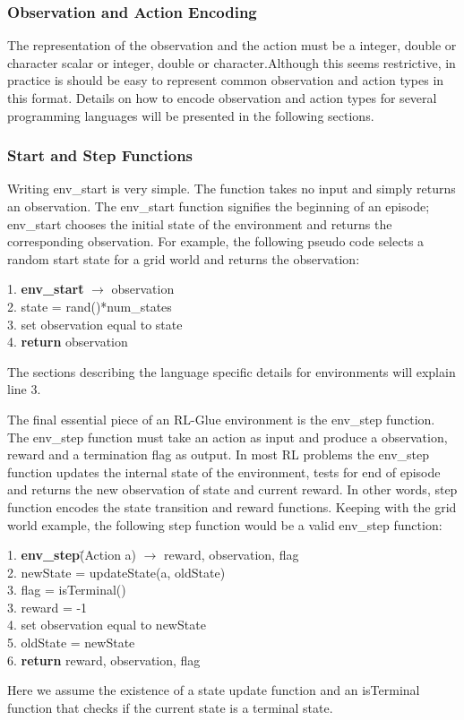 \documentclass[11pt]{article}
\begin{document}
\subsubsection{Observation and Action Encoding}
The representation of the observation and the action must be a integer, double or character scalar or integer, double or character.Although this seems restrictive, in practice is should be easy to represent common observation and action types in this format. Details on how to encode observation and action types for several programming languages will be presented in the following sections.

\subsubsection{Start and Step Functions}
Writing env\_start is very simple. The function takes no input and simply returns an observation. The env\_start function signifies the beginning of an episode; env\_start chooses the initial state of the environment and returns the corresponding observation. For example, the following pseudo code selects a random start state for a grid world and returns the observation:
\begin{tabbing}
1. {\bf env\_start}\= $\rightarrow$ observation\\
2. \>state = rand()*num\_states\\
3. \>set observation equal to state\\
4. {\bf return} observation
\end{tabbing}
The sections describing the language specific details for environments will explain line 3.

The final essential piece of an RL-Glue environment is the env\_step function. The env\_step function must take an action as input and produce a observation, reward and a termination flag as output. In most RL problems the  env\_step function updates the internal state of the environment, tests for end of episode and returns the new observation of state and current reward. In other words, step function encodes the state transition and reward functions. Keeping with the grid world example, the following step function would be a valid env\_step function:
\begin{tabbing}
1. {\bf env\_step}\=(Action a) $\rightarrow$ reward, observation, flag \\
2. \>newState = updateState(a, oldState)\\
3. \> flag = isTerminal()\\
3. \> reward = -1\\
4. \>set observation equal to newState\\
5. \>oldState = newState\\
6. {\bf return} reward, observation, flag
\end{tabbing}
Here we assume the existence of a state update function and an isTerminal function that checks if the current state is a terminal state.
\end{document}
